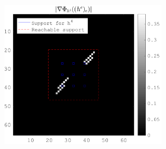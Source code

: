 \begin{figure}[!h]
\begin{subfigure}[b]{0.49\textwidth}
\begin{subfigure}[b]{0.49\textwidth}
	\end{subfigure}
		\begin{subfigure}[b]{0.49\textwidth}\centering
	\includegraphics[width=\textwidth]{figures/xp_grad_iterations/xp_128x128_sc2_angl1_K3_S3_node4_partgrad4_bestvalues}
	\end{subfigure}
\end{subfigure}
\end{figure}


\printbibliography





